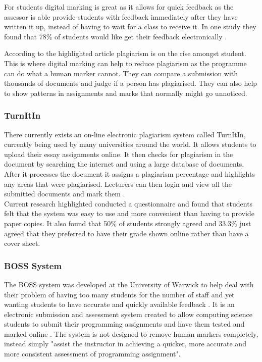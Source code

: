 \documentclass[12pt]{article}  %
\begin{document}
For students digital marking is great as it allows for quick feedback as the assessor is able provide students with feedback immediately after they have written it up, instead of having to wait for a class to receive it. In one study\cite{dahl_turnitin_2007} they found that 78\% of students would like get their feedback  electronically .

According to the highlighted article \cite{derby_duplication_2008} plagiarism is on the rise amongst student. This is where digital marking can help to reduce plagiarism as the programme can  do what a human marker cannot. They can compare a submission with thousands of documents and judge if a person has plagiarised. They can also help to show patterns in assignments and marks that normally might go unnoticed.

\subsubsection{TurnItIn}
There currently exists an on-line electronic plagiarism system called TurnItIn, \cite{noauthor_turnitin_nodate} currently being used by many universities around the world. It allows students to upload their essay assignments online. It then checks for plagiarism in the document by searching the internet and using a large database of documents. After it processes the document it assigns a plagiarism percentage and highlights any areas that were plagiarised. Lecturers can then login and view all the submitted documents and mark them .\\
Current research highlighted \cite{dahl_turnitin_2007} conducted a questionnaire and found that students felt that the system was easy to use and more convenient than having to provide paper copies. It also found that 50\% of students strongly agreed and 33.3\% just agreed that they preferred to have their grade shown online rather than have a cover sheet.

\subsubsection{BOSS System}
The BOSS system  was developed at the University of Warwick to help deal with their problem of having too many students for the number of staff and yet wanting students to have accurate and quickly available feedback \cite{joy_boss_2005}.
It is an electronic submission and assessment system created to allow computing science students to submit their programming assignments and have them tested and marked online \cite{joy_effective_1998}. The system is not designed to remove human markers completely, instead simply "assist the instructor in achieving a quicker, more accurate and more consistent assessment of programming assignment"\cite{joy_boss_2005}.
\end{document}
